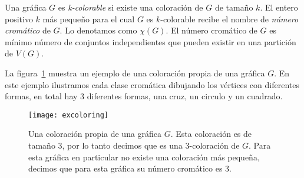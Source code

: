 Una gráfica $G$ es \emph{k-colorable} si existe una coloración de $G$ de tamaño $k$.
El entero positivo $k$ más pequeño para el cual $G$ es $k$-colorable recibe el nombre
de \emph{número cromático} de $G$. Lo denotamos como $\chi(G)$. El número cromático
de $G$ es mínimo número de conjuntos independientes que pueden existir en una partición
de $V(G)$.

La figura~\ref{fig:excoloring} muestra un ejemplo de una coloración propia de una gráfica $G$.
En este ejemplo ilustramos cada clase cromática dibujando los vértices con diferentes formas,
en total hay 3 diferentes formas, una cruz, un circulo y un cuadrado.
\begin{figure}[htpb]
  \centering
  \texttt{[image: excoloring]}
  \caption{Una coloración propia de una gráfica $G$. Esta coloración es de tamaño 3, por
  lo tanto decimos que es una 3-coloración de $G$. Para esta gráfica en particular
  no existe una coloración más pequeña, decimos que para esta gráfica su número
  cromático es 3.}
  \label{fig:excoloring}
\end{figure}
